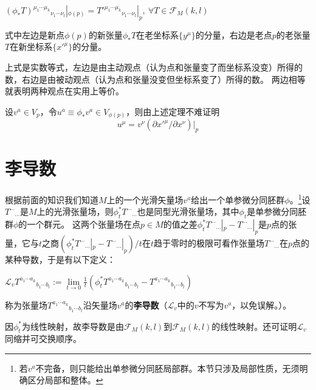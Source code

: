 \begin{theorem}
	$(\phi_*T)^{\mu_1 \cdots \mu_k}{}_{\nu_1 \cdots \nu_l}|_{\phi(p)} = T'^{\mu_1 \cdots \mu_k}{}_{\nu_1 \cdots \nu_l}|_p, ~ \forall T \in \mathscr{F}_M(k, l)$

	式中左边是新点$\phi(p)$的新张量$\phi_*T$在老坐标系$\{y^\mu\}$的分量，右边是老点$p$的老张量$T$在新坐标系$\{x'^\mu\}$的分量。
\end{theorem}

\begin{note}
	上式是实数等式，左边是由主动观点（认为点和张量变了而坐标系没变）所得的数，右边是由被动观点（认为点和张量没变但坐标系变了）所得的数。
	两边相等就表明两种观点在实用上等价。
\end{note}

\begin{example}
	设$v^a \in V_p$，令$u^a \equiv \phi_*v^a \in V_{\phi(p)}$，则由上述定理不难证明
	$$u^\mu = v^\nu(\partial x'^\mu / \partial x^\nu)|_p$$
\end{example}

\section{李导数}

根据前面的知识我们知道$M$上的一个光滑矢量场$v^a$给出一个单参微分同胚群$\phi$。\footnote{
	若$v^a$不完备，则只能给出单参微分同胚局部群。本节只涉及局部性质，无须明确区分局部和整体。
}设$T^{\cdots}{}_{\cdots}$是$M$上的光滑张量场，则$\phi^*_tT^{\cdots}{}_{\cdots}$也是同型光滑张量场，其中$\phi_t$是单参微分同胚群$\phi$的一个群元。
这两个张量场在点$p \in M$的值之差$\phi^*_tT^{\cdots}{}_{\cdots}|_p - T^{\cdots}{}_{\cdots}|_p$是$p$点的张量，它与$t$之商$(\phi^*_tT^{\cdots}{}_{\cdots}|_p - T^{\cdots}{}_{\cdots}|_p) / t$在$t$趋于零时的极限可看作张量场$T^{\cdots}{}_{\cdots}$在$p$点的某种导数，于是有以下定义：

\begin{definition}
	$\mathscr{L}_vT^{a_1 \cdots a_k}{}_{b_1 \cdots b_l} := \lim\limits_{t \to 0}\frac{1}{t}(\phi^*_tT^{a_1 \cdots a_k}{}_{b_1 \cdots b_l} - T^{a_1 \cdots a_k}{}_{b_1 \cdots b_l})$

	称为张量场$T^{a_1 \cdots a_k}{}_{b_1 \cdots b_l}$沿矢量场$v^a$的\textbf{李导数}（$\mathscr{L}_v$中的$v$不写为$v^a$，以免误解。）。
\end{definition}

\begin{note}
	因$\phi^*_t$为线性映射，故李导数是由$\mathscr{F}_M(k, l)$到$\mathscr{F}_M(k, l)$的线性映射。还可证明$\mathscr{L}_v$同缩并可交换顺序。
\end{note}

